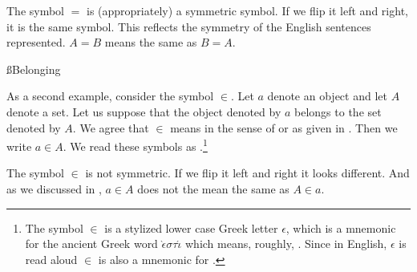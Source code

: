 The symbol $=$ is (appropriately) a symmetric symbol.
If we flip it left and right, it is the same symbol.
This reflects the symmetry of the English sentences represented.
$A = B$ means the same as $B = A$.

%

\ss{Belonging}

As a second example, consider the symbol $\in$.
Let $a$ denote an object and let $A$ denote a set.
Let us suppose that the object denoted by $a$ belongs to the set denoted by $A$.
We agree that $\in$ means  in the sense of  or  as given in .
Then we write $a \in A$.
We read these symbols as .\footnote{The symbol $\in$ is a stylized lower case Greek letter $\epsilon$, which is a mnemonic for the ancient Greek word $\grave{\epsilon} \sigma \tau \acute{\iota}$ which means, roughly, .
Since in English, $\epsilon$ is read aloud  $\in$ is also a mnemonic for .}

The symbol $\in$ is not symmetric.
If we flip it left and right it looks different.
And as we discussed in , $a \in A$ does not the mean the same as $A \in a$.

%
%
%
